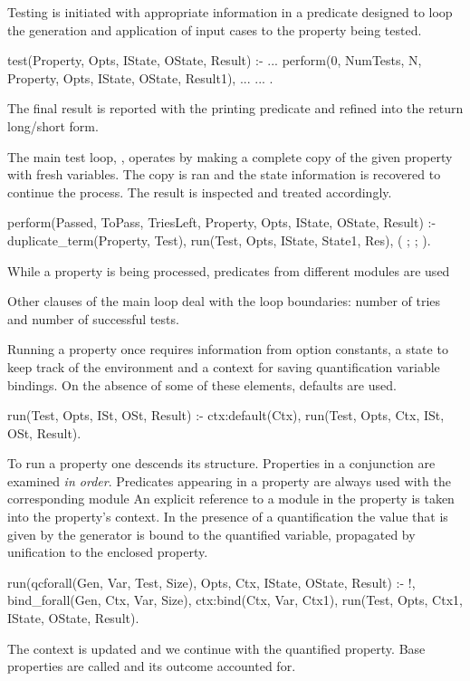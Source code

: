 Testing is initiated with appropriate information in a predicate
designed to loop the generation and application of input cases to the
property being tested.
%
\begin{yapcode}
 test(Property, Opts,
      IState, OState, Result) :-
   ...
   perform(0, NumTests, N, Property, Opts,
           IState, OState, Result1),
   ...
   ...
 .
\end{yapcode}
%
The final result is reported with the printing predicate and refined
into the return long/short form.


The main test loop, , operates by making a complete copy
of the given property with fresh variables.
%
The copy is ran and the state information is recovered to continue the
process.
%
The result is inspected and treated accordingly.
%
\begin{yapcode}
 perform(Passed, ToPass, TriesLeft, Property,
         Opts, IState, OState, Result) :-
   duplicate_term(Property, Test),
   run(Test, Opts, IState, State1, Res),
   (
   ;
   ;
   ).
\end{yapcode}While a property is being processed, predicates from different modules
are used

%
Other clauses of the main loop deal with the loop boundaries: number of
tries and number of successful tests.


Running a property once requires information from option constants, a state to
keep track of the environment and a context for saving quantification
variable bindings.
%
On the absence of some of these elements, defaults are used.
%
\begin{yapcode}
 run(Test, Opts, ISt, OSt, Result) :-
   ctx:default(Ctx),
   run(Test, Opts, Ctx, ISt, OSt, Result).
\end{yapcode}


To run a property one descends its structure.
%
Properties in a conjunction are examined \emph{in order}.
%
Predicates appearing in a property are always used with the
corresponding module
%
An explicit reference to a module in the property is taken into the
property's context.
%
In the presence of a \plqc{} quantification the value that is given by
the generator is bound to the quantified variable, propagated by
unification to the enclosed property.
%
\begin{yapcode}
 run(qcforall(Gen, Var, Test, Size),
     Opts, Ctx, IState, OState, Result) :- 
   !, bind_forall(Gen, Ctx, Var, Size),
   ctx:bind(Ctx, Var, Ctx1),
   run(Test, Opts, Ctx1,
       IState, OState, Result).
\end{yapcode}
The context is updated and we continue with the quantified property.
%
Base properties are called and its outcome accounted for.
%


